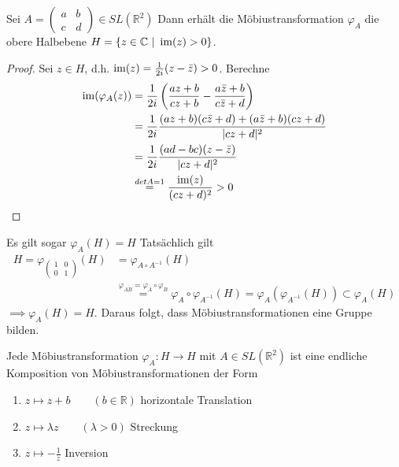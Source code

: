 \documentclass[../main.tex]{subfiles}
\begin{document}
\begin{lemma}
    Sei $A =\begin{pmatrix}
        a&b\\c&d
    \end{pmatrix}\in SL(\mathbb{R}^2)$
    Dann erhält die Möbiustransformation $\varphi _A$ die obere Halbebene
    $H=\{ z\in \mathbb{C} \ | \ \operatorname{im} (z)>0\}$.
\end{lemma}

\begin{proof}
    Sei $z \in H$, d.h. $\operatorname{im} (z)= \frac{1}{2i} (z- \bar{z}) >0$.
    Berechne
    \begin{align*}
        \operatorname{im}(\varphi _A (z)) &= \frac{1}{2i}\left( \frac{az+b}{cz+b}-\frac{a\bar{z}+b}{c\bar{z}+d} \right) \\
        &= \frac{1}{2i} \frac{(az+b)(c\bar{z}+d)+(a\bar{z}+b)(cz+d)}{|cz+d|^2} \\
        &= \frac{1}{2i} \frac{(ad-bc)(z-\bar{z})}{|cz+d|^2} \\
        & \overset{det A=1}{=} \frac{\operatorname{im} (z)}{(cz+d)^2} >0
    \end{align*}
\end{proof}
\begin{remark}
    Es gilt sogar $\varphi _A(H) = H$
    Tatsächlich gilt 
    \begin{align*}
        H=\varphi _{\begin{pmatrix}
            1 & 0 \\ 0  & 1
        \end{pmatrix}}(H) &= \varphi _{A \circ A^{-1}}(H) \\
        &\overset{\varphi_{AB}=\varphi_A \circ \varphi_B}{=} \varphi _A \circ \varphi _{A^{-1}}(H)=\varphi_A (\varphi _{A^{-1}}(H))\subset \varphi _A (H)
    \end{align*} $\implies \varphi _A (H)=H$. Daraus folgt, dass Möbiustransformationen eine Gruppe bilden.
    
\end{remark}

\begin{lemma}
    Jede Möbiustransformation $\varphi _A : H \to H$ mit $A \in SL(\mathbb{R}^2)$ ist eine endliche
    Komposition von Möbiustransformationen der Form
    \begin{enumerate}
        \item $z \mapsto z + b \qquad (b\in \mathbb{R})$ horizontale Translation
        \item $z \mapsto \lambda z \qquad (\lambda >0)$ Streckung
        \item $z \mapsto -\frac{1}{z} $ Inversion
    \end{enumerate}
\end{lemma}
\end{document}
